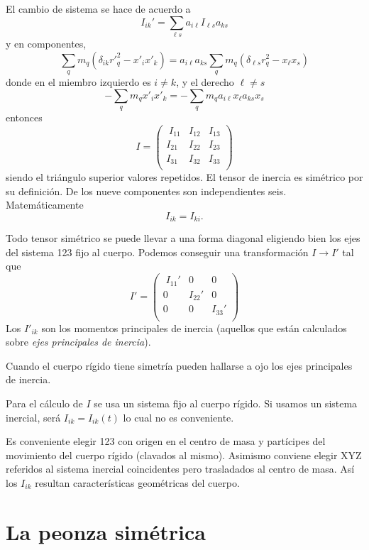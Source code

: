 \documentclass[10pt,oneside]{CBFT_book}
\begin{document}
El cambio de sistema se hace de acuerdo a
\[
	I_{ik}' = \sum_{\ell s} a_{i\ell} I_{\ell s} a_{ks}
\]
y en componentes,
\[
	\sum_q m_q ( \delta_{ik} {r'}^2_q - x'_i x'_k ) =  a_{i\ell} a_{ks} \sum_q m_q
	( \delta_{\ell s} r^2_q - x_\ell x_s )
\]
donde en el miembro izquierdo es $i \neq k$, y el derecho $\ell \neq s$
\[
	- \sum_q m_q x'_i x'_k =  - \sum_q m_q a_{i\ell} x_\ell a_{ks}  x_s 
\]
entonces 
\[
	I =
	\begin{pmatrix} \;
		I_{11} & I_{12} & I_{13} \\
		I_{21} & I_{22} & I_{23} \\ 
		I_{31} & I_{32} & I_{33} \\
	\end{pmatrix}
\]
siendo el triángulo superior valores repetidos. El tensor de inercia es simétrico por su 
definición. De los nueve componentes son independientes seis. Matemáticamente
\[
	I_{ik} = I_{ki}.
\]

Todo tensor simétrico se puede llevar a una forma diagonal eligiendo bien los ejes del 
sistema 123 fijo al cuerpo. Podemos conseguir una transformación $I \to I'$ tal que 
\[
	I' =
	\begin{pmatrix} \;
		I_{11}' & 0 & 0 \\
		0 & I_{22}' & 0 \\ 
		0 & 0 & I_{33}' \\
	\end{pmatrix}
\]
Los $I'_{ik}$ son los momentos principales de inercia (aquellos que están calculados sobre
{\it ejes principales de inercia}).

Cuando el cuerpo rígido tiene simetría pueden hallarse a ojo los ejes principales de inercia.

Para el cálculo de $I$ se usa un sistema fijo al cuerpo rígido. Si usamos un sistema inercial,
será $I_{ik}=I_{ik}(t)$ lo cual no es conveniente.

Es conveniente elegir 123 con origen en el centro de masa y partícipes del movimiento del 
cuerpo rígido (clavados al mismo). Asimismo conviene elegir XYZ referidos al sistema inercial
coincidentes pero trasladados al centro de masa. Así los $I_{ik}$ resultan características
geométricas del cuerpo.

\section{La peonza simétrica}
\end{document}
